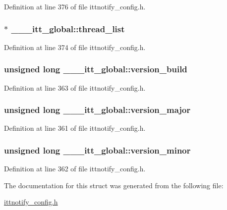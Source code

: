 Definition at line 376 of file ittnotify\-\_\-config.\-h.

\hypertarget{struct______itt__global_aa28553355cdc4eb4f7a51911f15ea938}{
\subsubsection[{thread\-\_\-list}]{$\ast$ \-\_\-\-\_\-\-\_\-itt\-\_\-global\-::thread\-\_\-list}}\label{struct______itt__global_aa28553355cdc4eb4f7a51911f15ea938}


Definition at line 374 of file ittnotify\-\_\-config.\-h.

\hypertarget{struct______itt__global_a4ad1debe7bab64e55300de356e7f73a9}{
\subsubsection[{version\-\_\-build}]{\setlength{\rightskip}{0pt plus 5cm}unsigned long \-\_\-\-\_\-\-\_\-itt\-\_\-global\-::version\-\_\-build}}\label{struct______itt__global_a4ad1debe7bab64e55300de356e7f73a9}


Definition at line 363 of file ittnotify\-\_\-config.\-h.

\hypertarget{struct______itt__global_aaad26e96e84268d03a08cb840a2113c3}{
\subsubsection[{version\-\_\-major}]{\setlength{\rightskip}{0pt plus 5cm}unsigned long \-\_\-\-\_\-\-\_\-itt\-\_\-global\-::version\-\_\-major}}\label{struct______itt__global_aaad26e96e84268d03a08cb840a2113c3}


Definition at line 361 of file ittnotify\-\_\-config.\-h.

\hypertarget{struct______itt__global_a4487d06049ec27f22ad144eb2f57e0b5}{
\subsubsection[{version\-\_\-minor}]{\setlength{\rightskip}{0pt plus 5cm}unsigned long \-\_\-\-\_\-\-\_\-itt\-\_\-global\-::version\-\_\-minor}}\label{struct______itt__global_a4487d06049ec27f22ad144eb2f57e0b5}


Definition at line 362 of file ittnotify\-\_\-config.\-h.



The documentation for this struct was generated from the following file\-:\begin{DoxyCompactItemize}
\item 
\hyperlink{ittnotify__config_8h}{ittnotify\-\_\-config.\-h}\end{DoxyCompactItemize}
